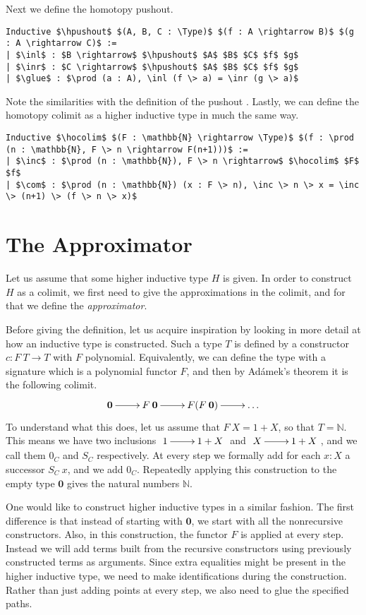 \documentclass[a4paper,UKenglish]{lipics-v2016}
\newcommand{\Boperator}[1]{\mathrm{\mathbf{#1}}}
\newcommand{\zero}[0]{\textbf{0}}
\newcommand{\hpushout}[0]{\Boperator{hpushout}}
\newcommand{\hocolim}[0]{\Boperator{hocolim}}
\newcommand{\inl}[0]{\Boperator{inl}}
\newcommand{\inr}[0]{\Boperator{inr}}
\newcommand{\glue}[0]{\Boperator{glue}}
\newcommand{\inc}[0]{\Boperator{inc}}
\newcommand{\com}[0]{\Boperator{com}}
\newcommand{\Type}[0]{\operatorname{\textsc{Type}}}
\begin{document}
Next we define the homotopy pushout.
\lstset{language=Coq}
\begin{lstlisting}
Inductive $\hpushout$ $(A, B, C : \Type)$ $(f : A \rightarrow B)$ $(g : A \rightarrow C)$ :=
| $\inl$ : $B \rightarrow$ $\hpushout$ $A$ $B$ $C$ $f$ $g$
| $\inr$ : $C \rightarrow$ $\hpushout$ $A$ $B$ $C$ $f$ $g$
| $\glue$ : $\prod (a : A), \inl (f \> a) = \inr (g \> a)$
\end{lstlisting}
Note the similarities with the definition of the pushout \cite{mac2013categories}.
Lastly, we can define the homotopy colimit as a higher inductive type in much the same way.
\lstset{language=Coq}
\begin{lstlisting}
Inductive $\hocolim$ $(F : \mathbb{N} \rightarrow \Type)$ $(f : \prod (n : \mathbb{N}, F \> n \rightarrow F(n+1)))$ :=
| $\inc$ : $\prod (n : \mathbb{N}), F \> n \rightarrow$ $\hocolim$ $F$ $f$
| $\com$ : $\prod (n : \mathbb{N}) (x : F \> n), \inc \> n \> x = \inc \> (n+1) \> (f \> n \> x)$
\end{lstlisting}

\section{The Approximator}
\label{sec:approximator}
Let us assume that some higher inductive type $H$ is given.
In order to construct $H$ as a colimit, we first need to give the approximations in the colimit, and for that we define the \emph{approximator}.

Before giving the definition, let us acquire inspiration by looking in more detail at how an inductive type is constructed.
Such a type $T$ is defined by a constructor $c : F \> T \rightarrow T$ with $F$ polynomial.
Equivalently, we can define the type with a signature which is a polynomial functor $F$, and then by Ad\'amek's theorem it is the following colimit.
\[
\xymatrix
{
	\zero \ar[r] & F \> \zero  \ar[r] & F(F \> \zero) \ar[r] & \ldots
}
\]
To understand what this does, let us assume that $F \> X = 1 + X$, so that $T = \mathbb{N}$.
This means we have two inclusions  $\xymatrix{1 \ar[r] & 1+X}$ and  $\xymatrix{X \ar[r] & 1+X}$, and we call them $0_C$ and $S_C$ respectively.
At every step we formally add for each $x : X$ a successor $S_C \> x$, and we add $0_C$.
Repeatedly applying this construction to the empty type $\zero$ gives the natural numbers $\mathbb{N}$.

One would like to construct higher inductive types in a similar fashion.
The first difference is that instead of starting with $\zero$, we start with all the nonrecursive constructors.
Also, in this construction, the functor $F$ is applied at every step.
Instead we will add terms built from the recursive constructors using previously constructed terms as arguments.
Since extra equalities might be present in the higher inductive type, we need to make identifications during the construction.
Rather than just adding points at every step, we also need to glue the specified paths.
\end{document}
